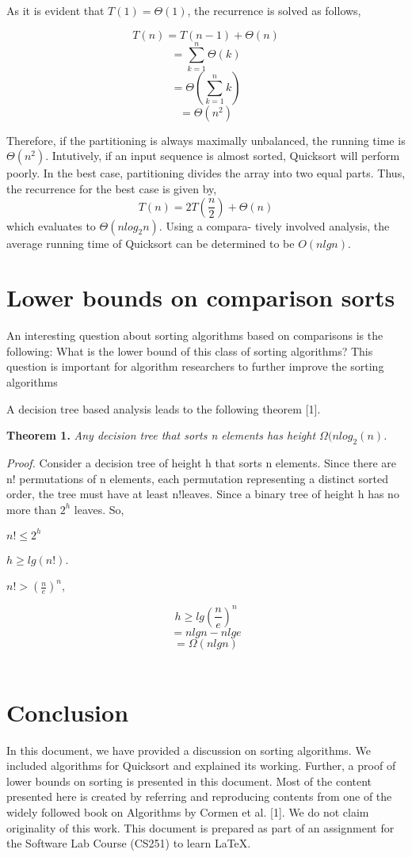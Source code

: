 \documentclass[a4paper, 10pt,twocolumn]{article}
\begin{document}
As it is evident that $T(1) = \Theta(1)$, the recurrence is solved as follows,

\[T(n)=T(n-1)+\Theta(n)\]
\[=\sum_{k=1}^n \Theta(k)\]
\[=\Theta(\sum_{k=1}^n k)\]
\[=\Theta(n^2)\]

Therefore, if the partitioning is always maximally
unbalanced, the running time is $\Theta(n^{2})$. Intutively,
if an input sequence is almost sorted, Quicksort
will perform poorly. In the best case, partitioning
divides the array into two equal parts. Thus, the
recurrence for the best case is given by,
\[T(n) = 2T(\frac{n}{2}) + \Theta(n)\]
which evaluates to $\Theta(nlog_{2}n)$. Using a compara-
tively involved analysis, the average running time
of Quicksort can be determined to be $O(nlgn)$.


\section{Lower bounds on comparison sorts}
An interesting question about sorting algorithms
based on comparisons is the following: What is
the lower bound of this class of sorting algorithms? This question is important for algorithm
researchers to further improve the sorting algorithms

A decision tree based analysis leads to the following theorem [1].


\noindent \textbf{Theorem 1.} \textsl{Any decision tree that sorts n elements has height $\Omega(nlog_{2}(n)$.}

\textsl{Proof.} Consider a decision tree of height h that
sorts n elements. Since there are n! permutations of n elements, each permutation representing a 
distinct sorted order, the tree must have at least n!leaves. Since a binary tree of height h has no more
than $2^{h}$ leaves. So,

$n!\leq2^{h}$ 



$h \geq lg(n!)$.


$n! >(\frac{n}{e})^{n}$,


\[h \geq lg(\frac{n}{e})^{n}\]
\[=nlgn-nlge\]
\[=\Omega(nlgn)\] \

\section{Conclusion}
In this document, we have provided a discussion
on sorting algorithms. We included algorithms for
Quicksort and explained its working. Further, a
proof of lower bounds on sorting is presented in this
document. Most of the content presented here is
created by referring and reproducing contents from
one of the widely followed book on Algorithms by
Cormen et al. [1]. We do not claim originality of
this work. This document is prepared as part of an
assignment for the Software Lab Course (CS251) to
learn \LaTeX.	
\end{document}
